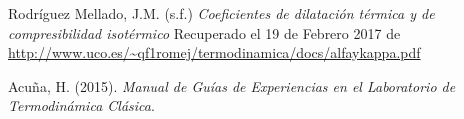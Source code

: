 \documentclass[12pt]{article}
\begin{document}


\begin{thebibliography}{6}
	Rodríguez Mellado, J.M. (s.f.) \textit{Coeficientes de dilatación térmica y de compresibilidad isotérmico} Recuperado el 19 de Febrero 2017 de	\url{http://www.uco.es/~qf1romej/termodinamica/docs/alfaykappa.pdf}
	
Acu\~na, H. (2015). \textit{Manual de Guías de Experiencias en el Laboratorio de Termodinámica Clásica}.

\end{thebibliography}
\end{document}
